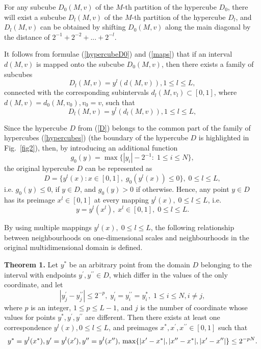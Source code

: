 \documentclass[sensors,article,submit,moreauthors,pdftex]{Definitions/mdpi}
\begin{document}
For any subcube $D_0(M,v)$ of the $M$-th partition of the hypercube $D_0$, there will exist a subcube $D_l(M,v)$ of the $M$-th partition of the hypercube $D_l$, and $D_l(M,v)$ can be obtained by shifting $D_0(M,v)$ along the main diagonal by the distance of $2^{-1}+2^{-2}+...+2^{-l}$. 

It follows from formulae (\ref{hypercubeD0}) and (\ref{maps}) that if an interval $d(M,v)$ is mapped onto the subcube $D_0(M,v)$, then there exists a family of subcubes
\begin{equation}
D_l(M,v) = y^l(d(M,v)), 1 \leq l \leq L,
\end{equation} 
connected with the corresponding subintervals $d_l(M,v_l) \subset [0,1]$, where $d(M,v) = d_0(M,v_0), v_0 = v$, such that 
\begin{equation}
D_l(M,v) = y^l(d_l(M,v)), 1 \leq l \leq L,
\end{equation} 

Since the hypercube $D$ from (\ref{D}) belongs to the common part of the family of hypercubes (\ref{hypercubes}) (the boundary of the hypercube $D$ is highlighted in Fig.~\ref{fig2}), then, by introducing an additional function 
\begin{equation}
g_0(y) = \max \{ |y_i|-2^{-1}: \; 1 \leq i \leq N \},
\end{equation} 
the original hypercube $D$ can be represented as
\begin{equation}
D = \{y^l(x): x \in [0,1], \; g_0(y^l(x)) \leq 0 \}, \; 0 \leq l \leq L,
\end{equation} 
i.e. $g_0(y) \leq 0$, if $y \in D$, and $g_0(y) > 0$ if otherwise. Hence, any point $y \in D$ has its preimage $x^l \in [0,1]$ at every mapping $y^l(x), \; 0 \leq l \leq L$, i.e.
\begin{equation}
y = y^l(x^l), \; x^l \in [0, 1], \; 0 \leq l \leq L.
\end{equation} 

By using multiple mappings $y^l(x), \; 0 \leq l \leq L$, the following relationship between neighbourhoods on one-dimensional scales and neighbourhoods in the original multidimensional domain is defined.

\textbf{Theorem 1.} Let $y^*$ be an arbitrary point from the domain $D$ belonging to the interval with endpoints $y^\prime, y^{\prime\prime} \in D$, which differ in the values of the only coordinate, and let
\begin{equation}
|y_j^\prime - y^{\prime\prime}_j| \leq 2^{-p}, \; y^\prime_i = y^{\prime\prime}_i = y_i^*, \; 1 \leq i \leq N, i \ne j,
\end{equation} 
where $p$ is an integer, $1 \leq p \leq L-1$, and $j$ is the number of coordinate whose values for points $y^*, y^\prime, y^{\prime\prime}$ are different. Then there exists at least one correspondence $y^l(x), 0 \leq l \leq L$, and preimages $x^*, x^\prime, x^{\prime\prime} \in [0, 1]$ such that
\begin{equation}
 y^* = y^l(x^*), y^\prime = y^l(x^\prime), y^{\prime\prime} = y^l(x^{\prime\prime}), \\
\max \{ |x^\prime - x^*|, |x^{\prime\prime} - x^*|, |x^\prime - x^{\prime\prime}| \} \leq 2^{-pN}.
\end{equation} 
\end{document}
